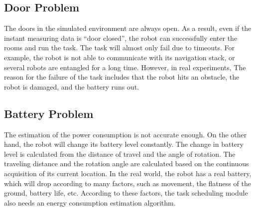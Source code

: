 \subsection*{Door Problem}
The doors in the simulated environment are always open. As a result, even if the instant measuring data is ``door closed'', the robot can successfully enter the rooms and run the task. The task will almost only fail due to timeouts. For example, the robot is not able to communicate with its navigation stack, or several robots are entangled for a long time.
However, in real experiments, 
The reason for the failure of the task includes that the robot hits an obstacle, the robot is damaged, and the battery runs out. 

\subsection*{Battery Problem}
The estimation of the power consumption is not accurate enough. 
On the other hand, the robot will change its battery level constantly. The change in battery level is calculated from the distance of travel and the angle of rotation. The traveling distance and the rotation angle are calculated based on the continuous acquisition of its current location.
In the real world, the robot has a real battery, which will drop according to many factors, such as movement, the flatness of the ground, battery life, etc. According to these factors, the task scheduling module also needs an energy consumption estimation algorithm.


